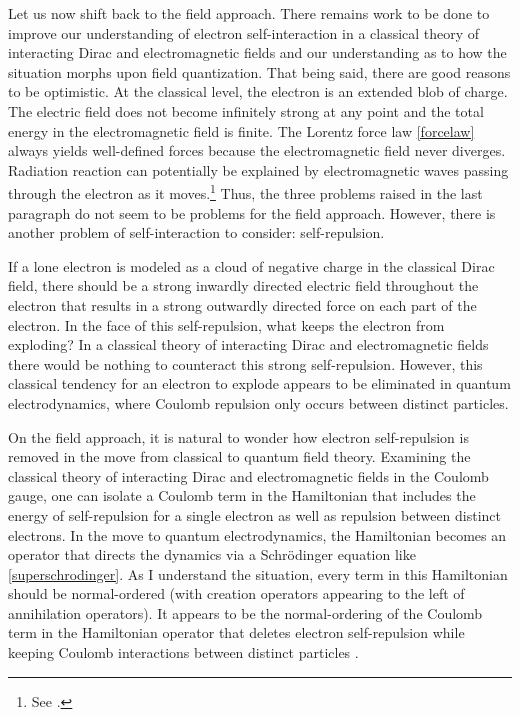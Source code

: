 \documentclass[onecolumn,secnumarabic,amsmath,amssymb,balancelastpage,nofootinbib]{article}
\begin{document}
Let us now shift back to the field approach.  There remains work to be done to improve our understanding of electron self-interaction in a classical theory of interacting Dirac and electromagnetic fields and our understanding as to how the situation morphs upon field quantization.  That being said, there are good reasons to be optimistic.  At the classical level, the electron is an extended blob of charge.  The electric field does not become infinitely strong at any point and the total energy in the electromagnetic field is finite.  The Lorentz force law \eqref{forcelaw} always yields well-defined forces because the electromagnetic field never diverges.  Radiation reaction can potentially be explained by electromagnetic waves passing through the electron as it moves.\footnote{See \citet[sec.\ 2.2]{gravitationalfield}.}  Thus, the three problems raised in the last paragraph do not seem to be problems for the field approach.  However, there is another problem of self-interaction to consider: self-repulsion.

If a lone electron is modeled as a cloud of negative charge in the classical Dirac field, there should be a strong inwardly directed electric field throughout the electron that results in a strong outwardly directed force on each part of the electron.  In the face of this self-repulsion, what keeps the electron from exploding?  In a classical theory of interacting Dirac and electromagnetic fields there would be nothing to counteract this strong self-repulsion.  However, this classical tendency for an electron to explode appears to be eliminated in quantum electrodynamics, where Coulomb repulsion only occurs between distinct particles.

On the field approach, it is natural to wonder how electron self-repulsion is removed in the move from classical to quantum field theory.  Examining the classical theory of interacting Dirac and electromagnetic fields in the Coulomb gauge, one can isolate a Coulomb term in the Hamiltonian that includes the energy of self-repulsion for a single electron as well as repulsion between distinct electrons.  In the move to quantum electrodynamics, the Hamiltonian becomes an operator that directs the dynamics via a Schr\"{o}dinger equation like \eqref{superschrodinger}.  As I understand the situation, every term in this Hamiltonian should be normal-ordered (with creation operators appearing to the left of annihilation operators).  It appears to be the normal-ordering of the Coulomb term in the Hamiltonian operator that deletes electron self-repulsion while keeping Coulomb interactions between distinct particles \citep{selfrepulsion}.
\end{document}
